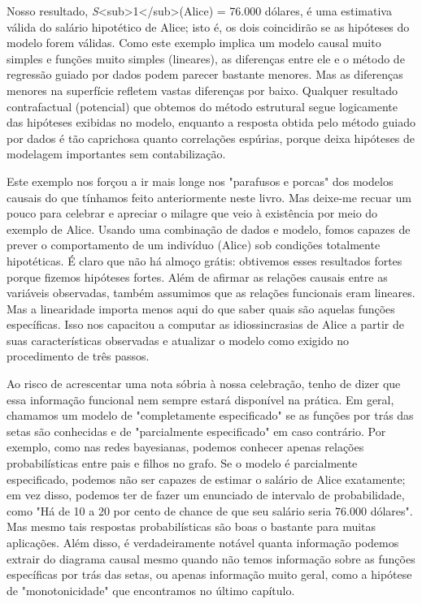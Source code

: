 \documentclass[11pt,a5paper,twoside]{book}
\begin{document}
Nosso resultado, \textit{S}<sub>1</sub>(Alice) = 76.000 dólares, é uma estimativa válida do salário hipotético de Alice; isto é, os dois coincidirão se as hipóteses do modelo forem válidas. Como este exemplo implica um modelo causal muito simples e funções muito simples (lineares), as diferenças entre ele e o método de regressão guiado por dados podem parecer bastante menores. Mas as diferenças menores na superfície refletem vastas diferenças por baixo. Qualquer resultado contrafactual (potencial) que obtemos do método estrutural segue logicamente das hipóteses exibidas no modelo, enquanto a resposta obtida pelo método guiado por dados é tão caprichosa quanto correlações espúrias, porque deixa hipóteses de modelagem importantes sem contabilização.

Este exemplo nos forçou a ir mais longe nos "parafusos e porcas" dos modelos causais do que tínhamos feito anteriormente neste livro. Mas deixe-me recuar um pouco para celebrar e apreciar o milagre que veio à existência por meio do exemplo de Alice. Usando uma combinação de dados e modelo, fomos capazes de prever o comportamento de um indivíduo (Alice) sob condições totalmente hipotéticas. É claro que não há almoço grátis: obtivemos esses resultados fortes porque fizemos hipóteses fortes. Além de afirmar as relações causais entre as variáveis observadas, também assumimos que as relações funcionais eram lineares. Mas a linearidade importa menos aqui do que saber quais são aquelas funções específicas. Isso nos capacitou a computar as idiossincrasias de Alice a partir de suas características observadas e atualizar o modelo como exigido no procedimento de três passos.

Ao risco de acrescentar uma nota sóbria à nossa celebração, tenho de dizer que essa informação funcional nem sempre estará disponível na prática. Em geral, chamamos um modelo de "completamente especificado" se as funções por trás das setas são conhecidas e de "parcialmente especificado" em caso contrário. Por exemplo, como nas redes bayesianas, podemos conhecer apenas relações probabilísticas entre pais e filhos no grafo. Se o modelo é parcialmente especificado, podemos não ser capazes de estimar o salário de Alice exatamente; em vez disso, podemos ter de fazer um enunciado de intervalo de probabilidade, como "Há de 10 a 20 por cento de chance de que seu salário seria 76.000 dólares". Mas mesmo tais respostas probabilísticas são boas o bastante para muitas aplicações. Além disso, é verdadeiramente notável quanta informação podemos extrair do diagrama causal mesmo quando não temos informação sobre as funções específicas por trás das setas, ou apenas informação muito geral, como a hipótese de "monotonicidade" que encontramos no último capítulo.
\end{document}
